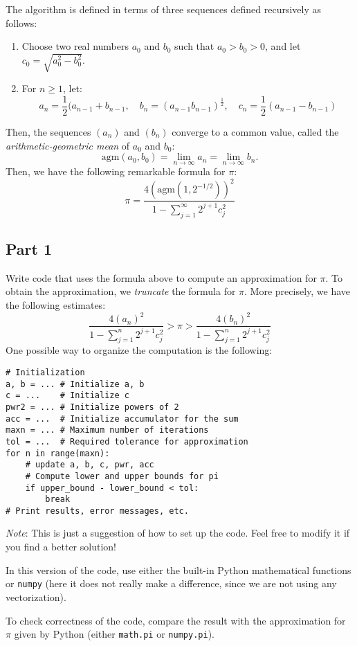\documentclass[12pt]{article}
\begin{document}
The algorithm is defined in terms of three sequences defined recursively as follows:
\begin{enumerate}
\item Choose two real numbers $a_0$ and $b_0$ such that $a_0>b_0>0$, and let $c_0=\sqrt{a_0^2-b_0^2}$.
\item For $n \ge 1$, let:
\[
a_n=\frac{1}{2}(a_{n-1}+b_{n-1},\quad b_n=(a_{n-1}b_{n-1})^{\frac{1}{2}},\quad c_n=\frac{1}{2}(a_{n-1}-b_{n-1})
\]
\end{enumerate}
Then, the sequences $(a_n)$ and $(b_n)$ converge to a common value, called the \emph{arithmetic-geometric mean} of $a_0$ and $b_0$:
\[
\text{agm}(a_0,b_0)=\lim_{n\to\infty}a_n=\lim_{n\to\infty}b_n.
\]
Then, we have the following remarkable formula for $\pi$:
\[
\pi=\frac{4\left(\text{agm}\left(1,2^{-1/2}\right)\right)^2}
{1-\sum_{j=1}^{\infty}2^{j+1}c_j^2}
\]

\subsection{Part 1} 

Write code that uses the formula above to compute an approximation for $\pi$. To obtain the approximation, we \emph{truncate} the formula for $\pi$. More precisely, we have the following estimates:
\[
\frac{4(a_n)^2}{1-\sum_{j=1}^{n}2^{j+1}c_j^2}>\pi>
\frac{4(b_n)^2}{1-\sum_{j=1}^{n}2^{j+1}c_j^2}
\]
One possible way to organize the computation is the following:
\begin{lstlisting}
# Initialization
a, b = ... # Initialize a, b
c = ...    # Initialize c
pwr2 = ... # Initialize powers of 2
acc = ...  # Initialize accumulator for the sum
maxn = ... # Maximum number of iterations
tol = ...  # Required tolerance for approximation
for n in range(maxn):
	# update a, b, c, pwr, acc
	# Compute lower and upper bounds for pi
	if upper_bound - lower_bound < tol:
		break
# Print results, error messages, etc.
\end{lstlisting}
\emph{Note}: This is just a suggestion of how to set up the code. Feel free to modify it if you find a better solution!

In this version of the code, use either the built-in Python mathematical functions or \texttt{numpy} (here it does not really make a difference, since we are not using any vectorization).

To check correctness of the code, compare the result with the approximation for $\pi$ given by Python (either \texttt{math.pi} or \texttt{numpy.pi}).
\end{document}
